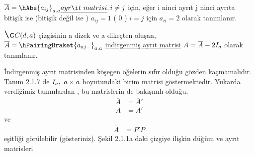 \documentclass[11pt]{amsbook}
\begin{document}
$\overline{A}= \hAbs{a_{ij}}_{a.a} \underline{ayrıt \ matrisi}, i \neq j $ için, eğer i ninci ayrıt j ninci ayrıta bitişik ise (bitişik değil ise )  $ a_{ij}= 1$ ( 0 ) $ i=j$ için $a_{ii}=2$ olarak tanımlanır.
\begin{defn}
    ${\Large Ç}(d,a)$ çizgisinin a dizek ve a dikeçten oluşan, \\
    $\overline{A}=\hPairingBraket{a_{aj-}}_{a.a}$
    \underline{indirgenmiş ayrıt matrisi} $ A = \overline{A} - 2 {\Large I_{a}}$ olarak tanımlanır.
\end{defn}
İndirgenmiş ayrıt matrisinden köşegen öğelerin sıfır olduğu gözden kaçmamalıdır. Tanım 2.1.7 de $ {\Large I_{a}} , \  a\times a  $ boyutundaki birim matrisi göstermektedir. Yukarda verdiğimiz tanımlardan , bu matrislerin de  bakışımlı olduğu, 
\begin{align*}
\overline{A} &= \overline{A}' \\
A&=A'
\end{align*}
ve
\begin{align*}
\overline{A} &= P'P
\end{align*}
eşitliği görülebilir (gösteriniz). Şekil 2.1.1a daki çizgiye ilişkin düğüm ve ayrıt matrisleri
\end{document}
